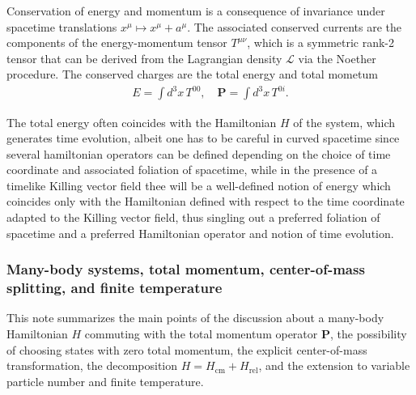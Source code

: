 \documentclass[../QFT_main.tex]{subfiles}
\begin{document}
Conservation of energy and momentum is a consequence of invariance under spacetime translations $x^\mu\mapsto x^\mu + a^\mu$.
The associated conserved currents are the components of the energy-momentum tensor $T^{\mu\nu}$, which is a symmetric rank-2 tensor that can be derived from the Lagrangian density $\mathcal{L}$ via the Noether procedure.
The conserved charges are the total energy and total mometum 
\begin{align}
E = \int d^3 x\, T^{00}, \quad \mathbf{P} = \int d^3 x\, T^{0i}.
\end{align}

The total energy often coincides with the Hamiltonian $H$ of the system, which generates time evolution, albeit one has to be careful in curved spacetime since several hamiltonian operators can be defined depending on the choice of time coordinate and associated foliation of spacetime, while in the presence of a timelike Killing vector field thee will be a well-defined notion of energy which coincides only with the Hamiltonian defined with respect to the time coordinate adapted to the Killing vector field, thus singling out a preferred foliation of spacetime and a preferred Hamiltonian operator and notion of time evolution.


\subsubsection[Many-body systems, total momentum, center-of-mass splitting, and finite temperature]{Many-body systems, total momentum, center-of-mass splitting, and finite temperature}
This note summarizes the main points of the discussion about a many-body Hamiltonian $H$ commuting with the total momentum operator $\mathbf{P}$, the possibility of choosing states with zero total momentum, the explicit center-of-mass transformation, the decomposition $H=H_{\text{cm}}+H_{\text{rel}}$, and the extension to variable particle number and finite temperature.
\end{document}
